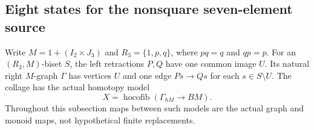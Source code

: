 \subsection{Eight states for the nonsquare seven-element source}

Write $M=1+(I_2\times J_3)$ and
$R_3=\{1,p,q\}$, where $pq=q$ and $qp=p$.
For an $(R_3,M)$-biset $S$, the left retractions $P,Q$ have
one common image $U$.  Its natural right $M$-graph $\Gamma$
has vertices $U$ and one edge $Ps\to Qs$ for each
$s\in S\setminus U$.  The collage has the actual homotopy model
\[
 X=\operatorname{hocofib}(\Gamma_{hM}\longrightarrow BM).
\]
Throughout this subsection maps between such models are the
actual graph and monoid maps, not hypothetical finite replacements.

